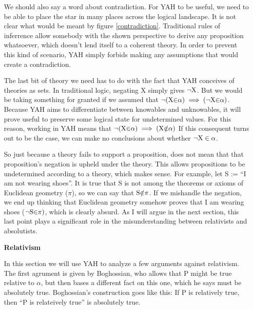 \documentclass[12pt]{article}
\begin{document}
\begin{flushleft}
We should also say a word about contradiction.
For YAH to be useful, we need to be able to place the star in many places across the logical landscape.
It is not clear what would be meant by figure \ref{contradiction}.
Traditional rules of inferrence allow somebody with the shown perspective to derive any proposition whatsoever, which doesn't lend itself to a coherent theory.
In order to prevent this kind of scenario, YAH simply forbids making any assumptions that would create a contradiction.

The last bit of theory we need has to do with the fact that YAH conceives of theories as sets.
In traditional logic, negating X simply gives ${\neg}\textnormal{X}$.
But we would be taking something for granted if we assumed that ${\neg}(\textnormal{X}{\in} \alpha) \implies ({\neg}\textnormal{X}{\in} \alpha)$.
Because YAH aims to differentiate between knowables and unknowables, it will prove useful to preserve some logical state for undetermined values.
For this reason, working in YAH means that ${\neg}(\textnormal{X}{\in} \alpha) \implies (\textnormal{X}{\notin} \alpha)$
If this consequent turns out to be the case, we can make no conclusions about whether ${\neg}\textnormal{X} \in \alpha$.

So just because a theory fails to support a proposition, does not mean that that proposition's negation is upheld under the theory.
This allows propositions to be undetermined according to a theory, which makes sense.
For example, let S :=  ``I am not wearing shoes''.
It is true that S is not among the theorems or axioms of Euclidean geometry ($\pi$), so we can say that $\textnormal{S}{\notin} \pi$.
If we mishandle the negation, we end up thinking that Euclidean geometry somehow proves that I am wearing shoes ($\neg \textnormal{S}{\in} \pi)$, which is clearly absurd.
As I will argue in the next section, this last point plays a significant role in the misunderstanding between relativists and absolutists.


\setlength{\parindent}{0in}
\par\bigskip
\textbf{Relativism}
\setlength{\parindent}{0.5in}

In this section we will use YAH to analyze a few arguments against relativism.
The first agrument is given by Boghossian, who allows that P might be true relative to $\alpha$, but then bases a different fact on this one, which he says must be absolutely true.
Boghossian's construction goes like this:
If P is relatively true, then ``P is relateively true'' is absolutely true.


\end{flushleft}
\end{document}
